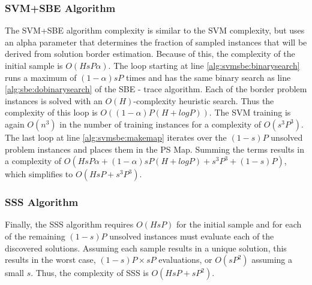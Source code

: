 \subsubsection{SVM+SBE Algorithm} The SVM+SBE algorithm complexity is similar to the SVM complexity, but uses an alpha parameter that determines the fraction of sampled instances that will be derived from solution border estimation.  Because of this, the complexity of the initial sample is $O(HsP\alpha)$.  The loop starting at line \ref{alg:svmsbe:binarysearch} runs a maximum of $(1-\alpha)sP$ times and has the same binary search as line \ref{alg:sbe:dobinarysearch} of the SBE - trace algorithm.  Each of the border problem instances is solved with an $O(H)$-complexity heuristic search.  Thus the complexity of this loop is $O((1-\alpha)P(H+logP))$.  The SVM training is again $O(n^3)$ in the number of training instances for a complexity of $O(s^3P^3)$.  The last loop at line \ref{alg:svmsbe:makemap} iterates over the $(1-s)P$ unsolved problem instances and places them in the PS Map.  Summing the terms results in a complexity of $O(HsP\alpha + (1-\alpha)sP(H+logP) + s^3P^3 + (1-s)P)$, which simplifies to  $O(HsP + s^3P^3)$.

\subsubsection{SSS Algorithm} Finally, the SSS algorithm requires $O(HsP)$ for the initial sample and for each of  the remaining $(1-s)P$ unsolved instances must evaluate each of the discovered solutions.  Assuming each sample results in a unique solution, this results in the worst case, $(1-s)P \times sP$ evaluations, or $O(sP^2)$ assuming a small $s$.  Thus, the complexity of SSS is $O(HsP + sP^2)$.

